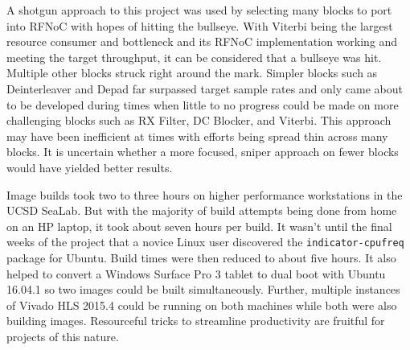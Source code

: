 \documentclass{article}
\begin{document}
A shotgun approach to this project was used by selecting many blocks to port into RFNoC with hopes of hitting the bullseye. With Viterbi being the largest resource consumer and bottleneck and its RFNoC implementation working and meeting the target throughput, it can be considered that a bullseye was hit. Multiple other blocks struck right around the mark. Simpler blocks such as Deinterleaver and Depad far surpassed target sample rates and only came about to be developed during times when little to no progress could be made on more challenging blocks such as RX Filter, DC Blocker, and Viterbi. This approach may have been inefficient at times with efforts being spread thin across many blocks. It is uncertain whether a more focused, sniper approach on fewer blocks would have yielded better results.

Image builds took two to three hours on higher performance workstations in the UCSD SeaLab. But with the majority of build attempts being done from home on an HP laptop, it took about seven hours per build. It wasn't until the final weeks of the project that a novice Linux user discovered the {\tt indicator-cpufreq} package for Ubuntu. Build times were then reduced to about five hours. It also helped to convert a Windows Surface Pro 3 tablet to dual boot with Ubuntu 16.04.1 so two images could be built simultaneously. Further, multiple instances of Vivado HLS 2015.4 could be running on both machines while both were also building images. Resourceful tricks to streamline productivity are fruitful for projects of this nature.
\end{document}
